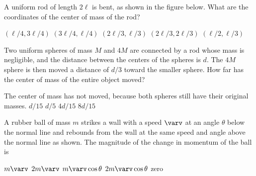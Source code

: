 \documentclass{../../oss-classkick-exam}
\begin{document}
\genheader


\genmultidirections

\gengravity

\raggedcolumns
\begin{multicols*}{2}
  \begin{questions}
    \question A uniform rod of length $2\ell$ is bent, as shown in the figure
    below. What are the coordinates of the center of mass of the rod?
    \begin{center}
    \end{center}
    \begin{choices}
      \choice $(\ell/4,3\ell/4)$
      \correctchoice $(3\ell/4,\ell/4)$
      \choice $(2\ell/3,\ell/3)$
      \choice $(2\ell/3,2\ell/3)$
      \choice $(\ell/2,\ell/3)$
    \end{choices}

    \question Two uniform spheres of mass $M$ and $4M$ are connected by a rod
    whose mass is negligible, and the distance between the centers of the
    spheres is $d$. The $4M$ sphere is then moved a distance of $d/3$ toward the
    smaller sphere. How far has the center of mass of the entire object moved?
    \begin{choices}
      \choice The center of mass has not moved, because both spheres still have
      their original masses.
      \choice $d/15$
      \choice $d/5$
      \correctchoice $4d/15$
      \choice $8d/15$
    \end{choices}
    
    \question A rubber ball of mass $m$ strikes a wall with a speed $\varv$ at
    an angle $\theta$ below the normal line and rebounds from the wall at the
    same speed and angle above the normal line as shown. The magnitude of the
    change in momentum of the ball is
    \begin{center}
    \end{center}
    \begin{choices}
      \choice $m\varv$
      \choice $2m\varv$
      \choice $m\varv\cos\theta$
      \choice $2m\varv\cos\theta$
      \choice  zero
    \end{choices}
    

\end{questions}
\end{multicols*}
\end{document}

